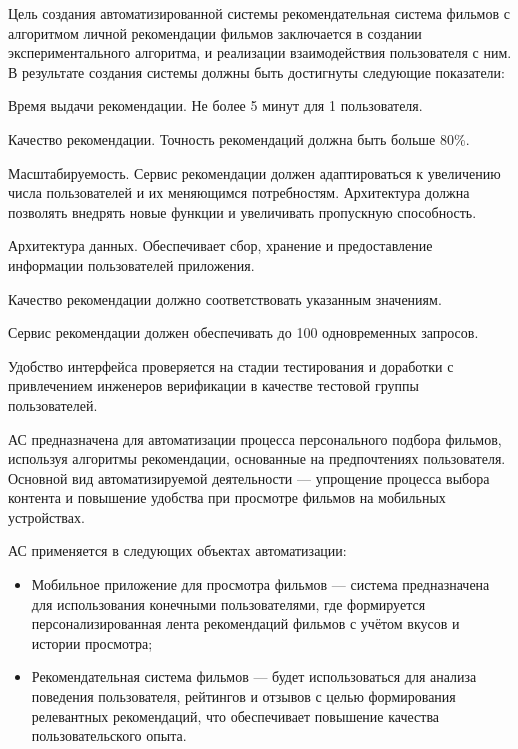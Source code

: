 

Цель создания автоматизированной системы рекомендательная система фильмов с алгоритмом личной рекомендации фильмов
заключается в создании экспериментального алгоритма, и реализации взаимодействия пользователя с ним.
В результате создания системы должны быть достигнуты следующие показатели:


Время выдачи рекомендации.
Не более 5 минут для 1 пользователя.

Качество рекомендации.
Точность рекомендаций должна быть больше 80\%.



Масштабируемость.
Сервис рекомендации должен адаптироваться к увеличению числа пользователей и их меняющимся потребностям.
Архитектура должна позволять внедрять новые функции и увеличивать пропускную способность.

Архитектура данных.
Обеспечивает сбор, хранение и предоставление информации пользователей приложения.



Качество рекомендации должно соответствовать указанным значениям.

Сервис рекомендации должен обеспечивать до 100 одновременных запросов.

Удобство интерфейса проверяется на стадии тестирования
и доработки с привлечением инженеров верификации
в качестве тестовой группы пользователей.


АС предназначена для автоматизации процесса персонального подбора фильмов,
используя алгоритмы рекомендации, основанные на предпочтениях пользователя.
Основной вид автоматизируемой деятельности --- упрощение процесса
выбора контента и повышение удобства при просмотре фильмов на мобильных устройствах.

АС применяется в следующих объектах автоматизации:

\begin{itemize}
	\item Мобильное приложение для просмотра фильмов --- система предназначена
	для использования конечными пользователями, где формируется персонализированная
	лента рекомендаций фильмов с учётом вкусов и истории просмотра;
	\item Рекомендательная система фильмов --- будет использоваться для анализа
	поведения пользователя, рейтингов и отзывов с целью формирования релевантных
	рекомендаций, что обеспечивает повышение качества пользовательского опыта.
\end{itemize}


